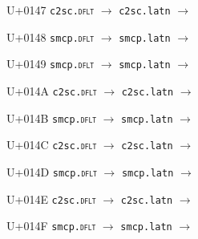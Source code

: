 \documentclass{article}
\begin{document}
\begin{substitutions}
\goodbreak

U+0147  \linebreak
    \texttt{c2sc.\textsc{dflt}} $\to$  \linebreak
    \texttt{c2sc.latn} $\to$  

\goodbreak

U+0148  \linebreak
    \texttt{smcp.\textsc{dflt}} $\to$  \linebreak
    \texttt{smcp.latn} $\to$  

\goodbreak

U+0149  \linebreak
    \texttt{smcp.\textsc{dflt}} $\to$  \linebreak
    \texttt{smcp.latn} $\to$  

\goodbreak

U+014A  \linebreak
    \texttt{c2sc.\textsc{dflt}} $\to$  \linebreak
    \texttt{c2sc.latn} $\to$  

\goodbreak

U+014B  \linebreak
    \texttt{smcp.\textsc{dflt}} $\to$  \linebreak
    \texttt{smcp.latn} $\to$  

\goodbreak

U+014C  \linebreak
    \texttt{c2sc.\textsc{dflt}} $\to$  \linebreak
    \texttt{c2sc.latn} $\to$  

\goodbreak

U+014D  \linebreak
    \texttt{smcp.\textsc{dflt}} $\to$  \linebreak
    \texttt{smcp.latn} $\to$  

\goodbreak

U+014E  \linebreak
    \texttt{c2sc.\textsc{dflt}} $\to$  \linebreak
    \texttt{c2sc.latn} $\to$  

\goodbreak

U+014F  \linebreak
    \texttt{smcp.\textsc{dflt}} $\to$  \linebreak
    \texttt{smcp.latn} $\to$  


\end{substitutions}
\end{document}
